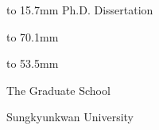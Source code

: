 \begin{center}
\vbox to 15.7mm {
\vfill
\fontsize{16pt}{16pt}\selectfont Ph.D. Dissertation
}
\nointerlineskip

\vspace{15.5mm}

\vbox to 70.1mm {
\vspace{0.5mm}
\vspace{8.4pt}
\fontsize{22pt}{22pt}\selectfont\thesistitle{}
\vfill
}
\nointerlineskip

\vbox to 53.5mm {
\vspace{0.5mm}
\vspace{7.2pt}
\fontsize{16pt}{16pt}\selectfont\studentname{}
\vfill
}
\nointerlineskip

\vspace{0.5mm}
\setlength{\parskip}{7.2pt}
\fontsize{16pt}{16pt}\selectfont
\departmentname{}\par
The Graduate School\par
Sungkyunkwan University\par
\end{center}